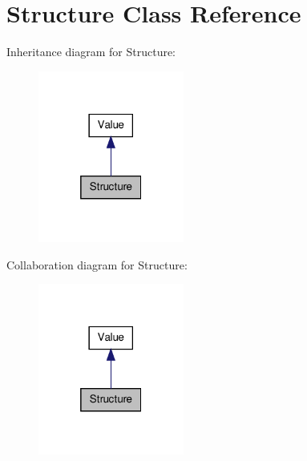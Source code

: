 \hypertarget{class_structure}{\section{Structure Class Reference}
\label{class_structure}
}


Inheritance diagram for Structure\-:
\nopagebreak
\begin{figure}[H]
\begin{center}
\leavevmode
\includegraphics[width=136pt]{class_structure__inherit__graph}
\end{center}
\end{figure}


Collaboration diagram for Structure\-:
\nopagebreak
\begin{figure}[H]
\begin{center}
\leavevmode
\includegraphics[width=136pt]{class_structure__coll__graph}
\end{center}
\end{figure}
